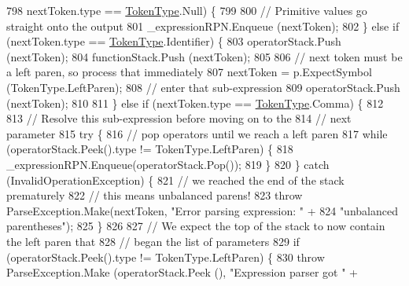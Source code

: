 \begin{DoxyCode}
798                         nextToken.type == \hyperlink{a00040_a301aa7c866593a5b625a8fc158bbeace}{TokenType}.Null) \{
799 
800                         \textcolor{comment}{// Primitive values go straight onto the output}
801                         \_expressionRPN.Enqueue (nextToken);
802                     \} \textcolor{keywordflow}{else} \textcolor{keywordflow}{if} (nextToken.type == \hyperlink{a00040_a301aa7c866593a5b625a8fc158bbeace}{TokenType}.Identifier) \{
803                         operatorStack.Push (nextToken);
804                         functionStack.Push (nextToken);
805 
806                         \textcolor{comment}{// next token must be a left paren, so process that immediately}
807                         nextToken = p.ExpectSymbol (TokenType.LeftParen);
808                         \textcolor{comment}{// enter that sub-expression}
809                         operatorStack.Push (nextToken);
810 
811                     \} \textcolor{keywordflow}{else} \textcolor{keywordflow}{if} (nextToken.type == \hyperlink{a00040_a301aa7c866593a5b625a8fc158bbeace}{TokenType}.Comma) \{
812 
813                         \textcolor{comment}{// Resolve this sub-expression before moving on to the}
814                         \textcolor{comment}{// next parameter}
815                         \textcolor{keywordflow}{try} \{
816                             \textcolor{comment}{// pop operators until we reach a left paren}
817                             \textcolor{keywordflow}{while} (operatorStack.Peek().type != TokenType.LeftParen) \{
818                                 \_expressionRPN.Enqueue(operatorStack.Pop());
819                             \}
820                         \} \textcolor{keywordflow}{catch} (InvalidOperationException) \{
821                             \textcolor{comment}{// we reached the end of the stack prematurely}
822                             \textcolor{comment}{// this means unbalanced parens!}
823                             \textcolor{keywordflow}{throw} ParseException.Make(nextToken, \textcolor{stringliteral}{"Error parsing expression: "} +
824                                 \textcolor{stringliteral}{"unbalanced parentheses"});
825                         \}
826 
827                         \textcolor{comment}{// We expect the top of the stack to now contain the left paren that }
828                         \textcolor{comment}{// began the list of parameters}
829                         \textcolor{keywordflow}{if} (operatorStack.Peek().type != TokenType.LeftParen) \{
830                             \textcolor{keywordflow}{throw} ParseException.Make (operatorStack.Peek (), \textcolor{stringliteral}{"Expression parser got "} +

\end{DoxyCode}
